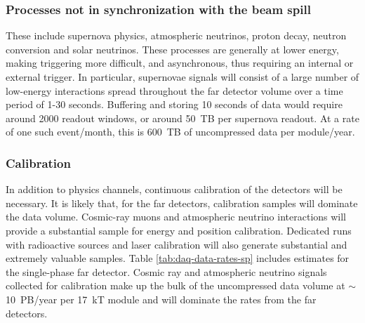 \subsubsection{Processes not in synchronization with the beam spill} These include supernova physics, atmospheric neutrinos, proton decay, neutron conversion and solar neutrinos.  These processes are generally at lower energy, making triggering more difficult, and asynchronous, thus requiring an internal or external trigger.  In particular, supernovae signals will consist of a large number of low-energy interactions spread throughout the far detector volume over a time period of 1-30 seconds. Buffering and storing 10 seconds of data would require around 2000 readout windows, or around 50~TB per supernova readout.  At a rate of one such event/month, this is 600~TB of uncompressed data per module/year.

\subsubsection{
Calibration}
In addition to physics channels, continuous calibration of the detectors will be necessary.  It is likely that, for the far detectors, calibration samples will  dominate the data volume. Cosmic-ray muons and atmospheric neutrino interactions will provide a substantial sample for energy and position calibration.  Dedicated runs with radioactive sources and laser calibration will also generate substantial and extremely valuable samples. Table \ref{tab:daq-data-rates-sp} includes estimates for the single-phase far detector.   Cosmic ray and atmospheric neutrino signals collected for calibration make up the bulk of the uncompressed  data volume at $\sim$ 10~PB/year per 17~kT module and will dominate the rates from the far detectors.  %








